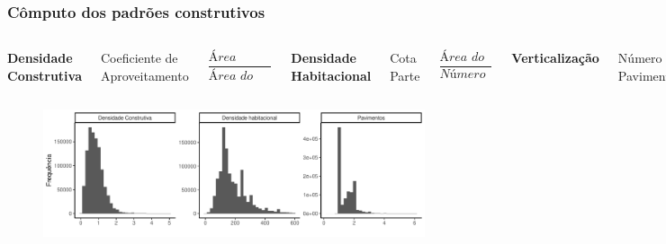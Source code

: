 \documentclass[%
    8pt, 
    aspectratio=169,
]{beamer}
\begin{document}
\begin{frame}
    \frametitle{Cômputo dos padrões construtivos}
    \bigskip

    \begin{columns}[T]
        \centering
        \textbf{Densidade Construtiva}
        
        Coeficiente de Aproveitamento
        
        \begin{equation*}
            \frac{\textit{Área Construída}}{\textit{Área do Terreno}}
        \end{equation*}

        \centering
        \textbf{Densidade Habitacional}

        Cota Parte

        \begin{equation*}
            \frac{\textit{Área do Terreno}}{\textit{Número de Unidades}}
        \end{equation*}

        \centering 
        \textbf{Verticalização} \hyperlink{appendix:verticalizacao}{}

        Número de Pavimentos

        \begin{equation*}
            \frac{\textit{Área Construída}}{\textit{Área Ocupada}}
        \end{equation*}
    \end{columns}

    \bigskip

    \begin{figure}
        \centering
        \includegraphics[width = .85\textwidth]{imagens/indicadores.pdf}
    \end{figure}
\end{frame}
\end{document}
